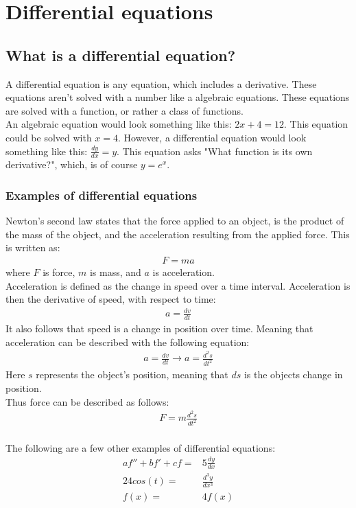 \chapter{Differential equations}

\section{What is a differential equation?}
A differential equation is any equation, which includes a derivative. These equations aren't solved with a number like a algebraic equations. These equations are solved with a function, or rather a class of functions. \\
An algebraic equation would look something like this: $2x+4=12$. This equation could be solved with $x=4$. However, a differential equation would look something like this: $\frac{dy}{dx} = y$. This equation asks "What function is its own derivative?", which, is of course $y=e^x$. \\

\subsection{Examples of differential equations}
Newton's second law states that the force applied to an object, is the product of the mass of the object, and the acceleration resulting from the applied force. This is written as: 
\begin{align*}
	F=ma
\end{align*}
where $F$ is force, $m$ is mass, and $a$ is acceleration. \\
Acceleration is defined as the change in speed over a time interval. Acceleration is then the derivative of speed, with respect to time:
\begin{align}
	a = \frac{dv}{dt}
\end{align}
It also follows that speed is a change in position over time. Meaning that acceleration can be described with the following equation:
\begin{align*}
	a = \frac{dv}{dt} \rightarrow a = \frac{d^2s}{dt^2}
\end{align*}
Here $s$ represents the object's position, meaning that $ds$ is the objects change in position. \\
Thus force can be described as follows:
\begin{align}
	 F = m\frac{d^2s}{dt^2}
\end{align}
\\
The following are a few other examples of differential equations:
\begin{align}
	af''+bf'+cf =& 5\frac{dy}{dx}		\\
	24cos(t)=&\frac{d^3y}{dx^3}			\\
	f(x)=&4f(x) 						
\end{align}

